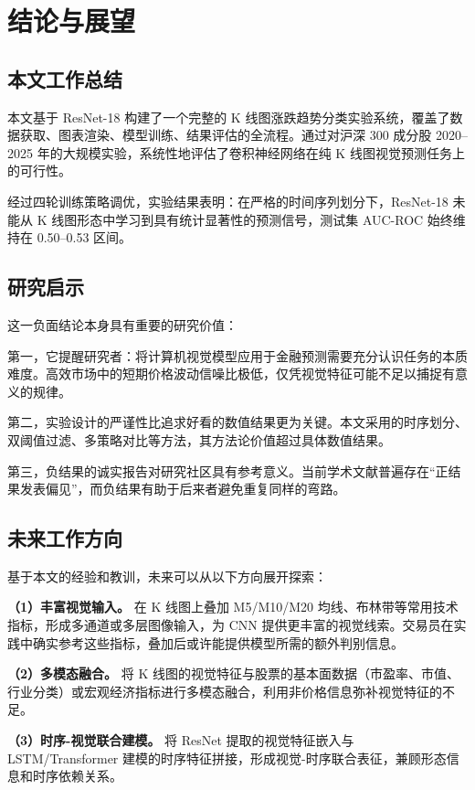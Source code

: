 \documentclass[12pt,a4paper]{ctexart}
\begin{document}
\section{结论与展望}

\subsection{本文工作总结}

本文基于 ResNet-18 构建了一个完整的 K 线图涨跌趋势分类实验系统，覆盖了数据获取、图表渲染、模型训练、结果评估的全流程。通过对沪深 300 成分股 2020--2025 年的大规模实验，系统性地评估了卷积神经网络在纯 K 线图视觉预测任务上的可行性。

经过四轮训练策略调优，实验结果表明：在严格的时间序列划分下，ResNet-18 未能从 K 线图形态中学习到具有统计显著性的预测信号，测试集 AUC-ROC 始终维持在 0.50--0.53 区间。

\subsection{研究启示}

这一负面结论本身具有重要的研究价值：

第一，它提醒研究者：将计算机视觉模型应用于金融预测需要充分认识任务的本质难度。高效市场中的短期价格波动信噪比极低，仅凭视觉特征可能不足以捕捉有意义的规律。

第二，实验设计的严谨性比追求好看的数值结果更为关键。本文采用的时序划分、双阈值过滤、多策略对比等方法，其方法论价值超过具体数值结果。

第三，负结果的诚实报告对研究社区具有参考意义。当前学术文献普遍存在``正结果发表偏见''，而负结果有助于后来者避免重复同样的弯路。

\subsection{未来工作方向}

基于本文的经验和教训，未来可以从以下方向展开探索：

\textbf{（1）丰富视觉输入。} 在 K 线图上叠加 M5/M10/M20 均线、布林带等常用技术指标，形成多通道或多层图像输入，为 CNN 提供更丰富的视觉线索。交易员在实践中确实参考这些指标，叠加后或许能提供模型所需的额外判别信息。

\textbf{（2）多模态融合。} 将 K 线图的视觉特征与股票的基本面数据（市盈率、市值、行业分类）或宏观经济指标进行多模态融合，利用非价格信息弥补视觉特征的不足。

\textbf{（3）时序-视觉联合建模。} 将 ResNet 提取的视觉特征嵌入与 LSTM/Transformer 建模的时序特征拼接，形成视觉-时序联合表征，兼顾形态信息和时序依赖关系。
\end{document}
